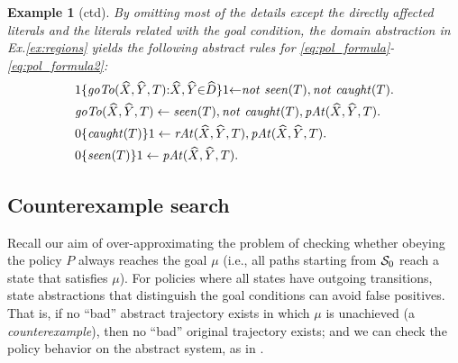 \documentclass{new_tlp}
\newcommand{\nhbls}{\vspace*{-0.5\baselineskip}}
\def\mi#1{\mathit{#1\/}}
\def\ba{\begin{array}}
\def\ea{\end{array}}
\def\beq{\begin{equation}}
\def\eeq#1{\label{#1}\end{equation}}
\newtheorem{exmp}{Example}
\begin{document}
\begin{exmp}[ctd]
By omitting most of the details %
except the directly
affected literals and the literals related with the goal condition,
the domain abstraction 
in Ex.\ref{ex:regions} 
yields the following abstract rules
for \eqref{eq:pol_formula}-\eqref{eq:pol_formula2}: %
\begin{align}
&1\{\mi{goTo}(\widehat{X},\widehat{Y},T){:} \widehat{X},\widehat{Y} {\in} \widehat{D}\}1 {\leftarrow} \mi{not}\ \mi{seen}(T), \mi{not}\ \mi{caught}(T).\nonumber\\%
&\mi{goTo}(\widehat{X},\widehat{Y},T) \leftarrow \mi{seen}(T), \mi{not}\ \mi{caught}(T), \mi{pAt}(\widehat{X},\widehat{Y},T).\nonumber\\%
&0\{\mi{caught}(T)\}1 \leftarrow \mi{rAt}(\widehat{X},\widehat{Y},T), \mi{pAt}(\widehat{X},\widehat{Y},T).\label{eq:abs_rules}\\%
&0\{\mi{seen}(T)\}1 \leftarrow \mi{pAt}(\widehat{X},\widehat{Y},T). \nonumber
\end{align}
\end{exmp}

\subsection{Counterexample search} Recall 
our aim of over-approxi\-mating the problem
of checking whether 
obeying the policy $P$ always reaches the goal $\mu$ 
(i.e., all paths starting from ${\cal S}_0$ %
reach a state that satisfies $\mu$).
For policies where all
states have outgoing transitions, state abstractions that distinguish
the goal conditions can avoid false positives. 
That is, if no ``bad'' abstract trajectory exists in which
$\mu$ is unachieved (a {\em counterexample}), then no 
``bad'' original trajectory exists; %
and we can check the policy behavior on
the abstract system, as in \cite{clarke03}.
\end{document}
